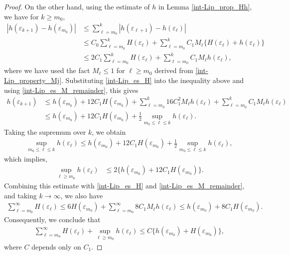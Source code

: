 \documentclass[reqno,12pt]{amsart} %
\theoremstyle{definition}
\theoremstyle{remark}
\numberwithin{equation}{section}
\begin{document}
\begin{proof}
On the other hand, using the estimate of $h$ in Lemma \ref{int-Lip_prop_Hh}, we have for $k\geq m_0$,
\begin{align*}
  |h(\varepsilon_{k+1})-h(\varepsilon_{m_0})| & \leq \sum_{\ell=m_0}^k|h(\varepsilon_{\ell+1})-h(\varepsilon_\ell)|\\
  &\leq C_0\sum_{\ell=m_0}^k H(\varepsilon_\ell)+\sum_{\ell=m_0}^kC_1M_\ell\{H(\varepsilon_\ell)+h(\varepsilon_\ell)\}\\
  &\leq 2C_1\sum_{\ell=m_0}^k H(\varepsilon_\ell)+\sum_{\ell=m_0}^kC_1M_\ell h(\varepsilon_\ell),
\end{align*}
where we have used the fact $M_\ell\leq 1$ for $\ell\geq m_0$ derived from \eqref{int-Lip_property_Mj}. Substituting \eqref{int-Lip_es_H} into the inequality above and using \eqref{int-Lip_es_M_remainder}, this gives
\begin{align*}
  h(\varepsilon_{k+1})&\leq h(\varepsilon_{m_0})+ 12C_1H(\varepsilon_{m_0})+\sum_{\ell=m_0}^{k}16C_1^2M_\ell h(\varepsilon_\ell)+\sum_{\ell=m_0}^kC_1M_\ell h(\varepsilon_\ell)\\
  & \leq h(\varepsilon_{m_0})+ 12C_1H(\varepsilon_{m_0})+\frac{1}{2}\sup_{m_0 \leq \ell\leq k}h(\varepsilon_\ell).
\end{align*}
Taking the supremum over $k$, we obtain
\begin{align*}
  \sup_{m_0 \leq \ell\leq k}h(\varepsilon_{\ell})\leq h(\varepsilon_{m_0})+ 12C_1H(\varepsilon_{m_0})+\frac{1}{2}\sup_{m_0 \leq \ell\leq k}h(\varepsilon_\ell),
\end{align*}
which implies, 
\begin{align*}
  \sup_{\ell \ge m_0} h(\varepsilon_{\ell})&\leq 2\{h(\varepsilon_{m_0})+ 12C_1H(\varepsilon_{m_0})\}. 
\end{align*}
Combining this estimate with \eqref{int-Lip_es_H} and \eqref{int-Lip_es_M_remainder}, and taking $k\to \infty$, we also have
\begin{align*}
  \sum_{\ell=m_0}^{\infty} H(\varepsilon_\ell)\leq 6H(\varepsilon_{m_0})+\sum_{\ell=m_0}^{\infty}8C_1M_\ell h(\varepsilon_\ell)\leq h(\varepsilon_{m_0})+8C_1H(\varepsilon_{m_0}). 
\end{align*}
Consequently, we conclude that
\begin{align}\label{est.m0-infity}
  \sum_{\ell = m_0}^\infty H(\varepsilon_\ell) + \sup_{\ell \ge m_0} h(\varepsilon_\ell)\leq C\{h(\varepsilon_{m_0})+H(\varepsilon_{m_0})\},
\end{align}
where $C$ depends only on $C_1$.


\end{proof}
\end{document}
